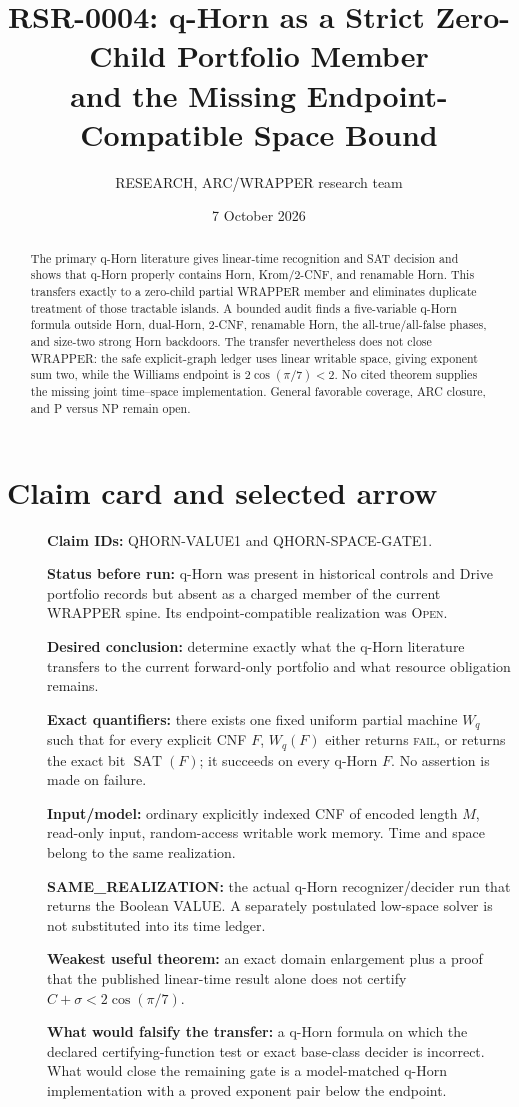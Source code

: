 \documentclass[11pt]{article}
\title{RSR-0004: q-Horn as a Strict Zero-Child Portfolio Member\\
and the Missing Endpoint-Compatible Space Bound}
\author{RESEARCH, ARC/WRAPPER research team}
\date{7 October 2026}
\newcommand{\SAT}{\operatorname{SAT}}
\begin{document}
\maketitle

\begin{abstract}
The primary q-Horn literature gives linear-time recognition and SAT decision
and shows that q-Horn properly contains Horn, Krom/2-CNF, and renamable Horn.
This transfers exactly to a zero-child partial WRAPPER member and eliminates
duplicate treatment of those tractable islands.  A bounded audit finds a
five-variable q-Horn formula outside Horn, dual-Horn, 2-CNF, renamable Horn,
the all-true/all-false phases, and size-two strong Horn backdoors.  The
transfer nevertheless does not close WRAPPER: the safe explicit-graph ledger
uses linear writable space, giving exponent sum two, while the Williams
endpoint is $2\cos(\pi/7)<2$.  No cited theorem supplies the missing joint
time--space implementation.  General favorable coverage, ARC closure, and
P versus NP remain open.
\end{abstract}

\section{Claim card and selected arrow}
\begin{description}
\item[] \textbf{Claim IDs:} QHORN-VALUE1 and QHORN-SPACE-GATE1.
\item[] \textbf{Status before run:} q-Horn was present in historical controls
and Drive portfolio records but absent as a charged member of the current
WRAPPER spine.  Its endpoint-compatible realization was \textsc{Open}.
\item[] \textbf{Desired conclusion:} determine exactly what the q-Horn
literature transfers to the current forward-only portfolio and what resource
obligation remains.
\item[] \textbf{Exact quantifiers:} there exists one fixed uniform partial
machine $W_q$ such that for every explicit CNF $F$, $W_q(F)$ either returns
\textsc{fail}, or returns the exact bit $\SAT(F)$; it succeeds on every
q-Horn $F$.  No assertion is made on failure.
\item[] \textbf{Input/model:} ordinary explicitly indexed CNF of encoded
length $M$, read-only input, random-access writable work memory.  Time and
space belong to the same realization.
\item[] \textbf{SAME\_REALIZATION:} the actual q-Horn recognizer/decider run
that returns the Boolean VALUE.  A separately postulated low-space solver is
not substituted into its time ledger.
\item[] \textbf{Weakest useful theorem:} an exact domain enlargement plus a
proof that the published linear-time result alone does not certify
$C+\sigma<2\cos(\pi/7)$.
\item[] \textbf{What would falsify the transfer:} a q-Horn formula on which
the declared certifying-function test or exact base-class decider is
incorrect.  What would close the remaining gate is a model-matched q-Horn
implementation with a proved exponent pair below the endpoint.
\end{description}
\end{document}
